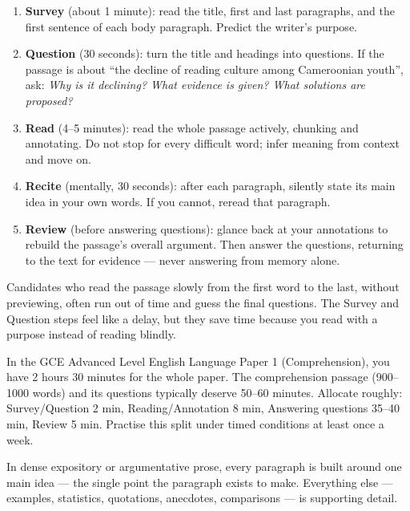 \documentclass[11pt]{article}
\newcommand{\cle}[1]{{\popxbold\color{popdark}#1}}
\newcounter{popsec}
\newcounter{popsub}
\newcommand{\courssub}[1]{%
  \stepcounter{popsub}%
  \par\vspace{9pt}\noindent{\popxbold\fontsize{11.5}{13}\selectfont\color{popink}{\color{poporange}\thepopsec.\thepopsub}\hspace{6pt}#1}\par\nopagebreak\vspace{4pt}
}
\begin{document}
\begin{methode}
\begin{enumerate}
\item \textbf{Survey} (about 1 minute): read the title, first and last paragraphs, and the first sentence of each body paragraph. Predict the writer's purpose.
\item \textbf{Question} (30 seconds): turn the title and headings into questions. If the passage is about ``the decline of reading culture among Cameroonian youth'', ask: \emph{Why is it declining? What evidence is given? What solutions are proposed?}
\item \textbf{Read} (4--5 minutes): read the whole passage actively, chunking and annotating. Do not stop for every difficult word; infer meaning from context and move on.
\item \textbf{Recite} (mentally, 30 seconds): after each paragraph, silently state its main idea in your own words. If you cannot, reread that paragraph.
\item \textbf{Review} (before answering questions): glance back at your annotations to rebuild the passage's overall argument. Then answer the questions, returning to the text for evidence --- never answering from memory alone.
\end{enumerate}
\end{methode}

\begin{attention}
Candidates who read the passage slowly from the first word to the last, without previewing, often run out of time and guess the final questions. The Survey and Question steps feel like a delay, but they save time because you read with a purpose instead of reading blindly.
\end{attention}

\begin{savaistu}
In the GCE Advanced Level English Language Paper 1 (Comprehension), you have 2 hours 30 minutes for the whole paper. The comprehension passage (900--1000 words) and its questions typically deserve 50--60 minutes. Allocate roughly: Survey/Question 2 min, Reading/Annotation 8 min, Answering questions 35--40 min, Review 5 min. Practise this split under timed conditions at least once a week.
\end{savaistu}

\courssub{Main Ideas versus Supporting Details}

In dense expository or argumentative prose, every paragraph is built around one \cle{main idea} --- the single point the paragraph exists to make. Everything else --- examples, statistics, quotations, anecdotes, comparisons --- is \cle{supporting detail}.
\end{document}
